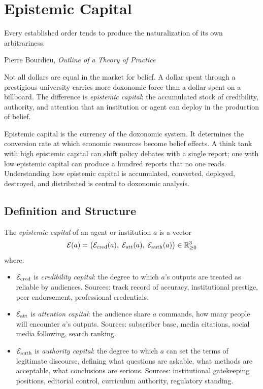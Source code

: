 \chapter{Epistemic Capital}
\label{ch:epistemic-capital}

\epigraph{Every established order tends to produce the naturalization of its own arbitrariness.}{Pierre Bourdieu, \textit{Outline of a Theory of Practice}}

\noindent
Not all dollars are equal in the market for belief.
A dollar spent through a prestigious university carries more doxonomic force than a dollar spent on a billboard.
The difference is \emph{epistemic capital}: the accumulated stock of credibility, authority, and attention that an institution or agent can deploy in the production of belief.

Epistemic capital is the currency of the doxonomic system.
It determines the conversion rate at which economic resources become belief effects.
A think tank with high epistemic capital can shift policy debates with a single report; one with low epistemic capital can produce a hundred reports that no one reads.
Understanding how epistemic capital is accumulated, converted, deployed, destroyed, and distributed is central to doxonomic analysis.


\section{Definition and Structure}
\label{sec:ch6-definition}

\begin{definition}
\label{def:epistemic-capital}
The \emph{epistemic capital} of an agent or institution $a$ is a vector
\[
  \mathcal{E}(a) = \bigl(\mathcal{E}_{\text{cred}}(a),\; \mathcal{E}_{\text{att}}(a),\; \mathcal{E}_{\text{auth}}(a)\bigr) \in \mathbb{R}_{\geq 0}^3
\]
where:
\begin{itemize}[nosep]
  \item $\mathcal{E}_{\text{cred}}$ is \emph{credibility capital}: the degree to which $a$'s outputs are treated as reliable by audiences.
  Sources: track record of accuracy, institutional prestige, peer endorsement, professional credentials.
  \item $\mathcal{E}_{\text{att}}$ is \emph{attention capital}: the audience share $a$ commands, how many people will encounter $a$'s outputs.
  Sources: subscriber base, media citations, social media following, search ranking.
  \item $\mathcal{E}_{\text{auth}}$ is \emph{authority capital}: the degree to which $a$ can set the terms of legitimate discourse, defining what questions are askable, what methods are acceptable, what conclusions are serious.
  Sources: institutional gatekeeping positions, editorial control, curriculum authority, regulatory standing.
\end{itemize}
\end{definition}

